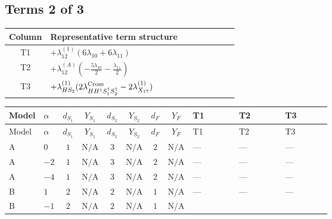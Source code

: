 \documentclass[8pt]{article}
\begin{document}
\begin{landscape}
\subsection*{Terms 2 of 3}
\begin{center}
\begin{tabular}{@{}c >{\raggedright\arraybackslash}p{0.82\linewidth}@{}}
\toprule
Column & Representative term structure \\
\midrule
T1 & \(\displaystyle +{\lambda_{12}^{(1)}} (6 {\lambda_{10}}+6 {\lambda_{11}})\) \\
\midrule
T2 & \(\displaystyle +{\lambda_{12}^{(A)}} \left(-\frac{5 {\lambda_{10}}}{2}-\frac{{\lambda_{11}}}{2}\right)\) \\
\midrule
T3 & \(\displaystyle +{\lambda_{HS_2}^{(1)}} (2 {\lambda_{H H^\dagger S_1^\dagger S_2^\dagger}^{\rm Cross}}-2 {\lambda_{X_{17}}^{(1)}})\) \\
\midrule
\bottomrule
\end{tabular}
\end{center}
\smallskip
\tiny
\begin{longtable}{@{}llcccccc >{\raggedright\arraybackslash}p{0.21\linewidth} >{\raggedright\arraybackslash}p{0.21\linewidth} >{\raggedright\arraybackslash}p{0.21\linewidth}@{}}
\toprule
Model & $\alpha$ & $d_{S_1}$ & $Y_{S_1}$ & $d_{S_2}$ & $Y_{S_2}$ & $d_F$ & $Y_F$ & T1 & T2 & T3 \\
\midrule
\endfirsthead
\toprule
Model & $\alpha$ & $d_{S_1}$ & $Y_{S_1}$ & $d_{S_2}$ & $Y_{S_2}$ & $d_F$ & $Y_F$ & T1 & T2 & T3 \\
\midrule
\endhead
A & $0$ & $1$ & $\text{N/A}$ & $3$ & $\text{N/A}$ & $2$ & $\text{N/A}$ & --- & --- & --- \\
\midrule
A & $-2$ & $1$ & $\text{N/A}$ & $3$ & $\text{N/A}$ & $2$ & $\text{N/A}$ & --- & --- & --- \\
\midrule
A & $-4$ & $1$ & $\text{N/A}$ & $3$ & $\text{N/A}$ & $2$ & $\text{N/A}$ & --- & --- & --- \\
\midrule
B & $1$ & $2$ & $\text{N/A}$ & $2$ & $\text{N/A}$ & $1$ & $\text{N/A}$ & --- & --- & --- \\
\midrule
B & $-1$ & $2$ & $\text{N/A}$ & $2$ & $\text{N/A}$ & $1$ & $\text{N/A}$ & \scriptsize\adjustbox{max width=\linewidth}{$\begin{gathered} +{\lambda_{12}^{(1)}} (6 {\lambda_{10}}+6 {\lambda_{11}})\end{gathered}$} & \scriptsize\adjustbox{max width=\linewidth}{$\begin{gathered} +{\lambda_{12}^{(A)}} \left(-\frac{5 {\lambda_{10}}}{2}-\frac{{\lambda_{11}}}{2}\right)\end{gathered}$} & \scriptsize\adjustbox{max width=\linewidth}{$\begin{gathered} +{\lambda_{HS_2}^{(1)}} (2 {\lambda_{H H^\dagger S_1^\dagger S_2^\dagger}^{\rm Cross}}-2 {\lambda_{X_{17}}^{(1)}})\end{gathered}$} \\

\end{longtable}
\end{landscape}
\end{document}
